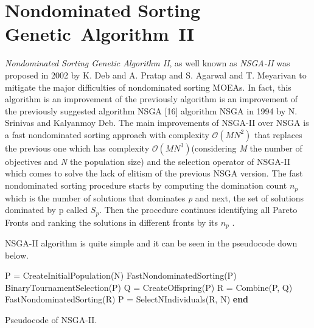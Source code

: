 \section{Nondominated Sorting Genetic~Algorithm~II}
\textit{Nondominated Sorting Genetic Algorithm II}, as well known as \textit{NSGA-II} was proposed in 2002 by K. Deb and A. Pratap and S. Agarwal and T. Meyarivan to mitigate the major difficulties of nondominated sorting MOEAs\cite{996017}. In fact, this algorithm is an improvement of the previously algorithm is an improvement of the previously suggested algorithm NSGA [16] algorithm NSGA\cite{Srinivas1994MuiltiobjectiveOU} in 1994 by N. Srinivas and Kalyanmoy Deb.
The main improvements of NSGA-II over NSGA is a fast nondominated sorting approach with complexity $\mathcal{O}(MN^{2})$ that replaces the previous one which has complexity $\mathcal{O}(MN^{3})$\cite{996017}(considering \textit{M} the number of objectives and \textit{N} the population size) and the selection operator of NSGA-II which comes to solve the lack of elitism of the previous NSGA version. The fast nondominated sorting procedure starts by computing the domination count $n_{p}$ which is the number of solutions that dominates \textit{p} and next, the set of solutions dominated by p called \textit{$S_{p}$}. Then the procedure continues identifying all Pareto Fronts and ranking the solutions in different fronts by its $n_{p}$\cite{996017} .

NSGA-II algorithm is quite simple and it can be seen in the pseudocode down below.

\begin{algorithm}[H]
\begin{algorithmic}[1]
\State P = CreateInitialPopulation(N)\;
\State  FastNondominatedSorting(P)\;
    \State BinaryTournamentSelection(P)\;
    \State Q = CreateOffspring(P)\;
    \State R = Combine(P, Q)\;
    \State FastNondominatedSorting(R)\;
    \State P = SelectNIndividuals(R, N)\;
  \EndWhile
  \State \textbf{end}
\end{algorithmic}
\caption{Pseudocode of NSGA-II.}
\end{algorithm}

